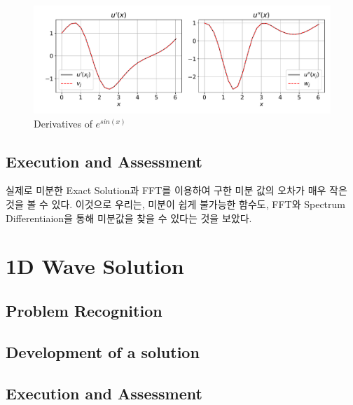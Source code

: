 \documentclass[11pt]{article}
\begin{document}
\begin{figure}[!ht]
  \centering
  \includegraphics[width=1\textwidth]{Differntiation_2.pdf}
  \caption{Derivatives of $e^{sin(x)}$}
\end{figure}

\subsection{Execution and Assessment}
실제로 미분한 Exact Solution과 FFT를 이용하여 구한 미분 값의 오차가 매우 작은 것을 볼 수 있다. 이것으로 우리는, 미분이 쉽게 불가능한 함수도, FFT와 Spectrum Differentiaion을 통해 미분값을 찾을 수 있다는 것을 보았다.














\section{1D Wave Solution}
\subsection{Problem Recognition} 


\subsection{Development of a solution} 



\subsection{Execution and Assessment}
\end{document}
